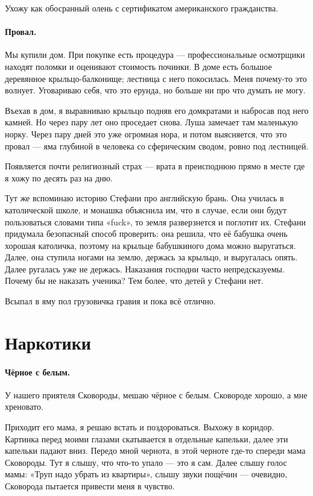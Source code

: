 \documentclass{book}
\begin{document}
Ухожу как обосранный олень с сертификатом американского гражданства.

\paragraph{Провал.}
Мы купили дом.
При покупке есть процедура --- профессиональные осмотрщики находят поломки и оценивают стоимость починки.
В доме есть большое деревянное крыльцо-балконище;
лестница с него покосилась.
Меня почему-то это волнует.
Уговариваю себя, что это ерунда, но больше ни про что думать не могу.

Въехав в дом, я выравниваю крыльцо подняв его домкратами и набросав под него камней.
Но через пару лет оно проседает снова.
Луша замечает там маленькую норку.
Через пару дней это уже огромная нора, и потом выясняется, что это провал ---
яма глубиной в человека со сферическим сводом, ровно под лестницей.

Появляется почти религиозный страх --- врата в преисподнюю прямо в месте где я хожу по десять раз на дню.

Тут же вспоминаю историю Стефани про английскую брань.
Она училась в католической школе, и монашка объяснила им, что в случае, если они будут пользоваться словами типа «fuck», то земля разверзнется и поглотит их.
Стефани придумала безопасный способ проверить:
она решила, что её бабушка очень хорошая католичка,
поэтому на крыльце бабушкиного дома можно выругаться.
Далее, она ступила ногами на землю, держась за крыльцо, и выругалась опять.
Далее ругалась уже не держась.
Наказания господни часто непредсказуемы.
Почему бы не наказать ученика?
Тем более, что детей у Стефани нет.

Всыпал в яму пол грузовичка гравия и пока всё отлично.

\section*{Наркотики}

\paragraph{Чёрное с белым.}
У нашего приятеля Сковороды, мешаю чёрное с белым.
Сковороде хорошо, а мне хреновато.

Приходит его мама, я решаю встать и поздороваться.
Выхожу в коридор.
Картинка перед моими глазами скатывается в отдельные капельки, далее эти капельки падают вниз.
Передо мной чернота, в этой черноте где-то спереди мама Сковороды.
Тут я слышу, что что-то упало --- это я сам.
Далее слышу голос мамы: «Труп надо убрать из квартиры»,
слышу звуки пощёчин --- очевидно, Сковорода пытается привести меня в чувство.
\end{document}
